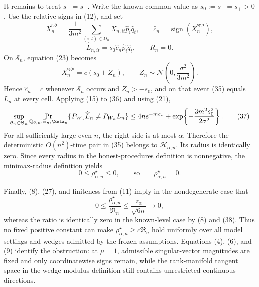 It remains to treat \(s_-=s_+\).  Write the known common value as \(s_0:=s_-=s_+>0\).  Use the relative signs in (12), and set
\[
\overline X_n^{\mathrm{sgn}}
=\frac1{3m^2}\sum_{(i,t)\in\Omega_n}X_{n,it}\widehat p_i\widehat q_t,
\qquad
\widehat c_n=\operatorname{sign}(\overline X_n^{\mathrm{sgn}}),
\]
\[
\widehat L_{n,it}=s_0\widehat c_n\widehat p_i\widehat q_t,
\qquad R_n=0.                                           \tag{35}
\]
On \(\mathcal S_n\), equation (23) becomes
\[
\overline X_n^{\mathrm{sgn}}=c(s_0+Z_n),
\qquad
Z_n\sim\mathcal N\!\left(0,\frac{\sigma^2}{3m^2}\right).       \tag{36}
\]
Hence \(\widehat c_n=c\) whenever \(\mathcal S_n\) occurs and \(Z_n>-s_0\), and on that event (35) equals \(L_n\) at every cell.  Applying (15) to (36) and using (21),
\[
\sup_{\vartheta_n\in\Theta_n}
\Pr_{\mathbb Q_{\vartheta,n},\Xi_n,\Zeta_n}
\{P_{W_n}\widehat L_n\ne P_{W_n}L_n\}
\le4ne^{-mc_\star}
+\exp\!\left\{-\frac{3m^2s_0^2}{2\sigma^2}\right\}.            \tag{37}
\]
For all sufficiently large even \(n\), the right side is at most \(\alpha\).  Therefore the deterministic \(O(n^2)\)-time pair in (35) belongs to \(\mathcal H_{\alpha,n}\).  Its radius is identically zero.  Since every radius in the honest-procedures definition is nonnegative, the minimax-radius definition yields
\[
0\le\rho_{\alpha,n}^{\star}\le0,
\qquad\text{so}\qquad \rho_{\alpha,n}^{\star}=0.      \tag{38}
\]

Finally, (8), (27), and finiteness from (11) imply in the nondegenerate case that
\[
0\le\frac{\rho_{\alpha,n}^{\star}}{\mathfrak R_n}
\le\frac{z_\alpha}{\sqrt{6n}}\longrightarrow0,         \tag{39}
\]
whereas the ratio is identically zero in the known-level case by (8) and (38).  Thus no fixed positive constant can make \(\rho_{\alpha,n}^{\star}\ge c\mathfrak R_n\) hold uniformly over all model settings and wedges admitted by the frozen assumptions.  Equations (4), (6), and (9) identify the obstruction: at \(\mu=1\), admissible singular-vector magnitudes are fixed and only coordinatewise signs remain, while the rank-manifold tangent space in the wedge-modulus definition still contains unrestricted continuous directions.
